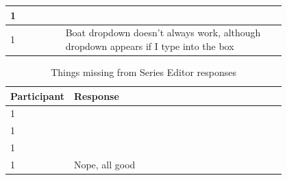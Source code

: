 \documentclass{l4proj}
\begin{document}
\begin{appendices}
\begin{table}[!ht]
\begin{tabular}{|l|p{0.8\linewidth}|}
        1 &   \\ \hline
        1 & Boat dropdown doesn't always work, although dropdown appears if I type into the box  \\ \hline
    \end{tabular}
\end{table}
\begin{table}[!ht]
    \centering
    \caption{Things missing from Series Editor responses}
    \begin{tabular}{|l|p{0.8\linewidth}||}
    \hline
        \textbf{Participant} & \textbf{Response}  \\ \hline
        1 &   \\ \hline
        1 &   \\ \hline
        1 &   \\ \hline
        1 & Nope, all good  \\ \hline
    \end{tabular}
\end{table}





\end{appendices}






\end{document}

